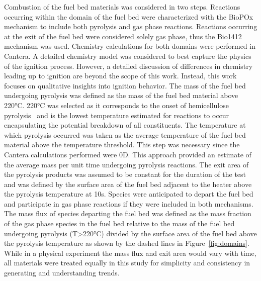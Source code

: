     
     Combustion of the fuel bed materials was considered in two steps. Reactions occurring within the domain of the fuel bed were characterized with the BioPOx mechanism to include both pyrolysis and gas phase reactions. Reactions occurring at the exit of the fuel bed were considered solely gas phase, thus the Bio1412 mechanism was used. Chemistry calculations for both domains were performed in Cantera. A detailed chemistry model was considered to best capture the physics of the ignition process. However, a detailed discussion of differences in chemistry leading up to ignition are beyond the scope of this work. Instead, this work focuses on qualitative insights into ignition behavior. The mass of the fuel bed undergoing pyrolysis was defined as the mass of the fuel bed material above 220\si{\celsius}. 220\si{\celsius} was selected as it corresponds to the onset of hemicellulose pyrolysis~\cite{Yang2007a} and is the lowest temperature estimated for reactions to occur encapsulating the potential breakdown of all constituents. The temperature at which pyrolysis occurred was taken as the average temperature of the fuel bed material above the temperature threshold. This step was necessary since the Cantera calculations performed were 0D. This approach provided an estimate of the average mass per unit time undergoing pyrolysis reactions. The exit area of the pyrolysis products was assumed to be constant for the duration of the test and was defined by the surface area of the fuel bed adjacent to the heater above the pyrolysis temperature at 10\si{\second}. Species were anticipated to depart the fuel bed and participate in gas phase reactions if they were included in both mechanisms. The mass flux of species departing the fuel bed was defined as the mass fraction of the gas phase species in the fuel bed relative to the mass of the fuel bed undergoing pyrolysis (T\textgreater220\si{\celsius}) divided by the surface area of the fuel bed above the pyrolysis temperature as shown by the dashed lines in Figure~\ref{fig:domains}. While in a physical experiment the mass flux and exit area would vary with time, all materials were treated equally in this study for simplicity and consistency in generating and understanding trends.
        

